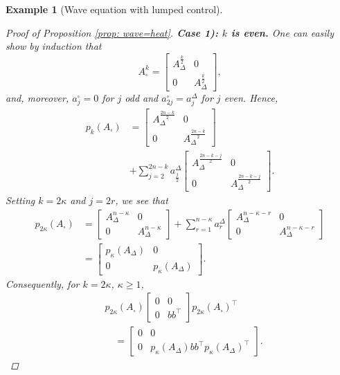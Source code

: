 \documentclass[journal,twoside,web]{ieeecolor}
\newtheorem{example}{Example}
\begin{document}
\begin{example}[Wave equation with lumped control]
\begin{proof}[Proof of Proposition \ref{prop: wave=heat}]
	\noindent
	\textbf{Case 1): $k$ is even.} One can easily show by induction that
	\begin{equation}
	A_\square^k = \begin{bmatrix} A_\Delta^{\frac{k}{2}} & 0 \\
	0 & A_{\Delta}^{\frac{k}{2}}\end{bmatrix},
	\end{equation}
	and, moreover, $a_j^\square=0$ for $j$ odd and $a_{2j}^\square=a_{j}^\Delta$ for $j$ even. Hence,
	\begin{align*}
	p_k(A_\square) &= \begin{bmatrix} A_\Delta^{\frac{2n-k}{2}} & 0 \\
	0 & A_{\Delta}^{\frac{2n-k}{2}}\end{bmatrix} \\
	&+ \sum_{j=2}^{2n-k} a_{\frac{j}{2}}^\Delta \begin{bmatrix} A_\Delta^{\frac{2n-k-j}{2}} & 0 \\
	0 & A_{\Delta}^{\frac{2n-k-j}{2}}\end{bmatrix}.
	\end{align*}
	Setting $k=2\kappa$ and $j=2r$, we see that
	\begin{align*}
	p_{2\kappa}(A_\square) &= \begin{bmatrix} A_\Delta^{n-\kappa} & 0 \\
	0 & A_{\Delta}^{n-\kappa}\end{bmatrix} + \sum_{r=1}^{n-\kappa} a_{r}^\Delta \begin{bmatrix} A_\Delta^{n-\kappa-r} & 0 \\
	0 & A_{\Delta}^{n-\kappa-r}\end{bmatrix} \\
	&= \begin{bmatrix} p_{\kappa}(A_\Delta) & 0 \\ 
	0 & p_{\kappa}(A_\Delta) \end{bmatrix}.
	\end{align*}
	Consequently, for $k=2\kappa$, $\kappa\geqslant1$, 
	\begin{align} \label{eq: 4.7}
	&p_{2\kappa}(A_\square)\begin{bmatrix} 0 & 0\\
	0 & bb^\top\end{bmatrix} p_{2\kappa}(A_{\square})^\top \nonumber \\
	&\quad= \begin{bmatrix} 0 & 0 \\ 0 & p_{\kappa}(A_\Delta) bb^\top p_{\kappa}(A_\Delta)^\top\end{bmatrix}.
	\end{align}
	

\end{proof}
\end{example}
\end{document}
